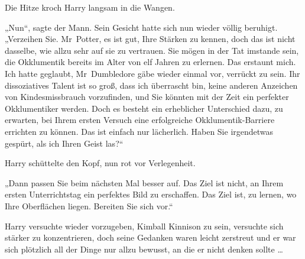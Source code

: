 Die Hitze kroch Harry langsam in die Wangen.

„Nun“, sagte der Mann. Sein Gesicht hatte sich nun wieder völlig beruhigt.
„Verzeihen Sie. Mr~Potter, es ist gut, Ihre Stärken zu kennen, doch das ist nicht dasselbe, wie allzu sehr auf sie zu vertrauen. Sie mögen in der Tat imstande sein, die Okklumentik bereits im Alter von elf Jahren zu erlernen. Das erstaunt mich. Ich hatte geglaubt, Mr~Dumbledore gäbe wieder einmal vor, verrückt zu sein. Ihr dissoziatives Talent ist so groß, dass ich überrascht bin, keine anderen Anzeichen von Kindesmissbrauch vorzufinden, und Sie könnten mit der Zeit ein perfekter Okklumentiker werden. Doch es besteht ein erheblicher Unterschied dazu, zu erwarten, bei Ihrem ersten Versuch eine erfolgreiche Okklumentik-Barriere errichten zu können. Das ist einfach nur lächerlich. Haben Sie irgendetwas gespürt, als ich Ihren Geist las?“

Harry schüttelte den Kopf, nun rot vor Verlegenheit.

„Dann passen Sie beim nächsten Mal besser auf. Das Ziel ist nicht, an Ihrem ersten Unterrichtstag ein perfektes Bild zu erschaffen. Das Ziel ist, zu lernen, wo Ihre Oberflächen liegen. Bereiten Sie sich vor.“

Harry versuchte wieder vorzugeben, Kimball Kinnison zu sein, versuchte sich stärker zu konzentrieren, doch seine Gedanken waren leicht zerstreut und er war sich plötzlich all der Dinge nur allzu bewusst, an die er nicht denken sollte …

